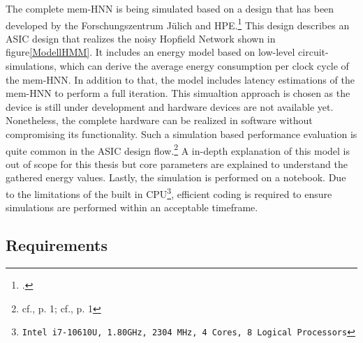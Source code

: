 The complete \ac{mem-HNN} is being simulated based on a design that has been developed by the Forschungszentrum Jülich and HPE.\footcite[cf.][3-4]{hizzaniMemristorbasedHardwareAlgorithms2023}  
This design describes an \ac{ASIC} design that realizes the noisy Hopfield Network shown in figure\ref{ModellHMM}.
It includes an energy model based on low-level circuit-simulations, which can derive the average energy consumption per clock cycle of the \ac{mem-HNN}.
In addition to that, the model includes latency estimations of the \ac{mem-HNN} to perform a full iteration. 
This simualtion approach is chosen as the device is still under development and hardware devices are not available yet.
Nonetheless, the complete hardware can be realized in software without compromising its functionality.
Such a simulation based performance evaluation is quite common in the \ac{ASIC} design flow.\footnote{cf.\cite{raoUltimateGuideASIC}, p. 1; cf.\cite{ASICDesignFlow}, p. 1}
A in-depth explanation of this model is out of scope for this thesis but core parameters are explained to understand the gathered energy values.
Lastly, the simulation is performed on a notebook.
Due to the limitations of the built in \ac{CPU}\footnote{\texttt{Intel i7-10610U, 1.80GHz, 2304 MHz, 4 Cores, 8 Logical Processors}}, efficient coding is required to ensure simulations are performed within an acceptable timeframe.

\subsection{Requirements}


